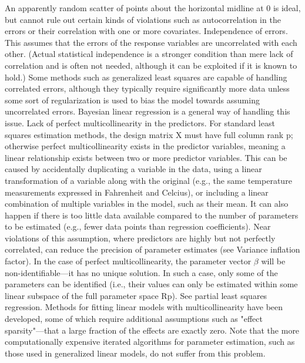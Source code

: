 An apparently random scatter of points about the horizontal midline at 0 is ideal, 
but cannot rule out certain kinds of violations such as autocorrelation in the errors or their 
correlation with one or more covariates.
Independence of errors. This assumes that the errors of the response variables are uncorrelated 
with each other.
(Actual statistical independence is a stronger condition than mere lack of correlation and is 
often not needed, although it can be exploited if it is known to hold.) 
Some methods such as generalized least squares are capable of handling correlated errors, 
although they typically require significantly more data unless some sort of regularization is used 
to bias the model towards assuming uncorrelated errors. Bayesian linear regression is a general 
way of handling this issue.
Lack of perfect multicollinearity in the predictors. 
For standard least squares estimation methods, the design matrix X must have full column rank p; 
otherwise perfect multicollinearity exists in the predictor variables, meaning a linear 
relationship exists between two or more predictor variables. 
This can be caused by accidentally duplicating a variable in the data, using a linear 
transformation of a variable along with the original 
(e.g., the same temperature measurements expressed in Fahrenheit and Celcius), or including a 
linear combination of multiple variables in the model, such as their mean. 
It can also happen if there is too little data available compared to the number of 
parameters to be estimated (e.g., fewer data points than regression coefficients). 
Near violations of this assumption, where predictors are highly but not perfectly correlated, 
can reduce the precision of parameter estimates (see Variance inflation factor). 
In the case of perfect multicollinearity, the parameter vector $\beta$ will be non-identifiable—it 
has no unique solution. In such a case, only some of the parameters can be identified 
(i.e., their values can only be estimated within some linear subspace of 
the full parameter space Rp). See partial least squares regression. 
Methods for fitting linear models with multicollinearity have been developed,
some of which require additional assumptions such as "effect sparsity"—that a large 
fraction of the effects are exactly zero.
Note that the more computationally expensive iterated algorithms for parameter estimation, 
such as those used in generalized linear models, do not suffer from this problem.


